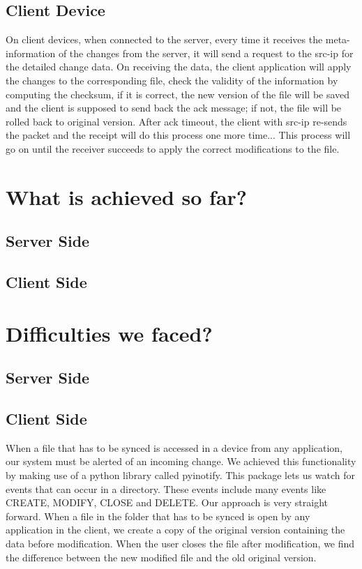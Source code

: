 \documentclass[paper=a4, fontsize=11pt]{scrartcl}
\numberwithin{equation}{section}		%
\numberwithin{figure}{section}			%
\numberwithin{table}{section}				%
\begin{document}
\subsection{Client Device}
On client devices, when connected to the server, every time it receives the meta-information of the changes from the server, it will send a request to the src-ip for the detailed change data. On receiving the data, the client application will apply the changes to the corresponding file, check the validity of the information by computing the checksum, if it is correct, the new version of the file will be saved and the client is supposed to send back the ack message; if not, the file will be rolled back to original version. After ack timeout, the client with src-ip re-sends the packet and the receipt will do this process one more time... This process will go on until the receiver succeeds to apply the correct modifications to the file. 
\section{What is achieved so far?}
\subsection{Server Side}
\subsection{Client Side}
\section{Difficulties we faced?}
\subsection{Server Side}
\subsection{Client Side}
When a file that has to be synced is accessed in a device from any application, our system must be alerted of an incoming change. We achieved this functionality by making use of a python library called pyinotify. This package lets us watch for events that can occur in a directory. These events include many events like CREATE, MODIFY, CLOSE and DELETE. Our approach is very straight forward. When a file in the folder that has to be synced is open by any application in the client, we create a copy of the original version containing the data before modification. When the user closes the file after modification, we find the difference between the new modified file and the old original version.
\end{document}
